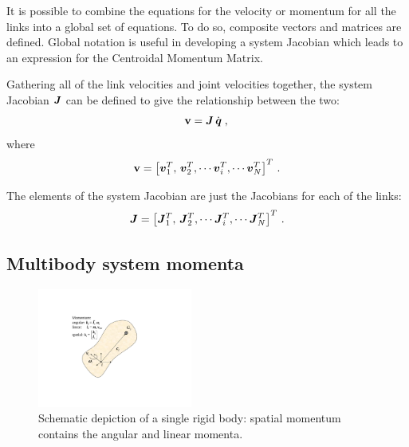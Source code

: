 \documentclass{llncs}
\newcommand{\bJ}{\mbox{\boldmath $J$}}
\newcommand{\bq}{\mbox{\boldmath $q$}}
\newcommand{\vJ}{\vec{J}}
\newcommand{\bqd}{\dot{\bq}}
\newcommand{\vv}{\vec{v}}
\newcommand{\bv}{{\bf v}}
\begin{document}
It is possible to combine the equations for the velocity or momentum
for all the links into a global set of equations.  To do
so, composite vectors and matrices are defined. %
Global notation is useful
in developing a system Jacobian which leads to an
expression for the Centroidal Momentum Matrix.

Gathering all of the link velocities and joint velocities together, the system Jacobian $\bJ$ can be defined to give the relationship between the two:
%
\begin{equation}
\label{eq:v}
\bv = \bJ \, \bqd \; ,\\
\end{equation}
%
where %
\begin{equation}
\bv = \left[ \vv_1^T, \, \vv_2^T, \cdots \vv_i^T, \cdots \vv_N^T \right]^T \, .
\end{equation}

The elements of the system Jacobian are just the Jacobians for each of the links:
%
\begin{equation}
\bJ = \left[ \vJ_1^T, \, \vJ_2^T, \cdots \vJ_i^T, \cdots \vJ_N^T \right]^T \, .
\end{equation}




\subsection{Multibody system momenta}

\begin{figure}[t]
\begin{center}
\includegraphics[width=2.0in]{Figures/fig1.pdf}
\end{center}
\caption{Schematic depiction of a single rigid body:
spatial momentum contains the angular and linear momenta.} \label{fig1}
\end{figure}
\end{document}
